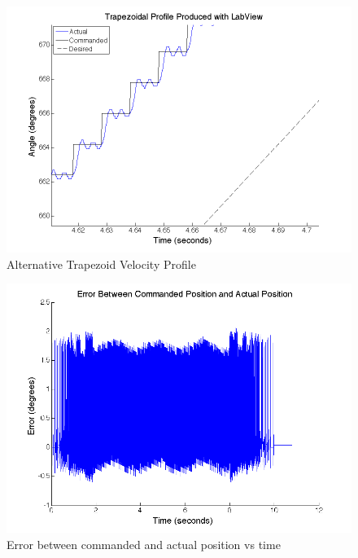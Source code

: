 \documentclass{article}
\theoremstyle{plain}
\theoremstyle{definition}
\theoremstyle{remark}
\begin{document}
\begin{figure}
\begin{center}
\includegraphics[width = 12cm]{labViewProfile_Detail1.png}
\caption{Alternative Trapezoid Velocity Profile}
\label{Q4a_Alt5}
\end{center}
\end{figure}

\begin{figure}
\begin{center}
\includegraphics[width = 12cm]{labViewCommandError.png}
\caption{Error between commanded and actual position vs time}
\label{Q4a_Alt6}
\end{center}
\end{figure}
\end{document}
